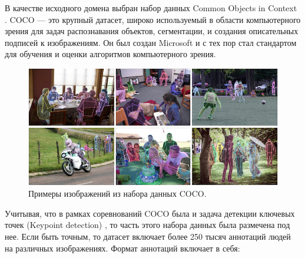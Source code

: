 В качестве исходного домена выбран набор данных Common Objects in Context \cite{COCO_dataset}. COCO — это крупный датасет, широко используемый в области компьютерного зрения для задач распознавания объектов, сегментации, и создания описательных подписей к изображениям. Он был создан Microsoft и с тех пор стал стандартом для обучения и оценки алгоритмов компьютерного зрения.

\begin{figure}[h]
	\centering
	\includegraphics[width=\textwidth]{./images/coco_dataset.png}
	\caption{Примеры изображений из набора данных COCO. \cite{COCO_topology}}
	\label{fig:coco_dataset}
\end{figure}

Учитывая, что в рамках соревнований COCO была и задача детекции ключевых точек (Keypoint detection) \cite{COCO_topology}, то часть этого набора данных была размечена под нее. Если быть точным, то датасет включает более 250 тысяч аннотаций людей на различных изображениях. Формат аннотаций включает в себя:

